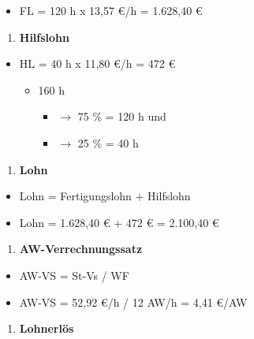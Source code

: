 \begin{itemize}
\item
  FL = 120 h x 13,57 €/h = 1.628,40 €
\end{itemize}

\begin{enumerate}
\def\labelenumi{\alph{enumi})}
\setcounter{enumi}{5}
\item
  \textbf{Hilfslohn}
\end{enumerate}

\begin{itemize}
\item
  HL = 40 h x 11,80 €/h = 472 €

  \begin{itemize}
  \item
    160 h

    \begin{itemize}
    \item
      $\to$ 75 \% = 120 h und
    \item
      $\to$ 25 \% = 40 h
    \end{itemize}
  \end{itemize}
\end{itemize}

\begin{enumerate}
\def\labelenumi{\alph{enumi})}
\setcounter{enumi}{6}
\item
  \textbf{Lohn}
\end{enumerate}

\begin{itemize}
\item
  Lohn = Fertigungslohn + Hilfslohn
\item
  Lohn = 1.628,40 € + 472 € = 2.100,40 €
\end{itemize}

\begin{enumerate}
\def\labelenumi{\alph{enumi})}
\setcounter{enumi}{7}
\item
  \textbf{AW-Verrechnungssatz}
\end{enumerate}

\begin{itemize}
\item
  AW-VS = St-Vs / WF
\item
  AW-VS = 52,92 €/h / 12 AW/h = 4,41 €/AW
\end{itemize}

\begin{enumerate}
\def\labelenumi{\roman{enumi})}
\item
  \textbf{Lohnerlös}
\end{enumerate}

